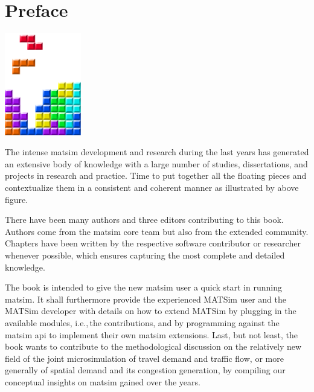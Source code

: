 \chapter*{Preface}

\begin{center} \includegraphics[width=0.25\textwidth, angle=0]{figures/MATSimBook.png} \end{center}

The intense \gls{matsim} development and research during the last years has generated an extensive body of knowledge with a large number of studies, dissertations, and projects in research and practice. Time to put together all the floating pieces and contextualize them in a consistent and coherent manner as illustrated by above figure. 

There have been many authors and three editors contributing to this book. Authors come from the \gls{matsim} core team but also from the extended community. Chapters have been written by the respective software contributor or researcher whenever possible, which ensures capturing the most complete and detailed knowledge.

The book is intended to give the new \gls{matsim} user a quick start in running \gls{matsim}. It shall furthermore provide the experienced MATSim user and the MATSim developer with details on how to extend MATSim by plugging in the available modules, i.e.,\,the \glspl{contribution}, and by programming against the \gls{matsim} \gls{api} to implement their own \gls{matsim} \glspl{extension}. Last, but not least, the book wants to contribute to the methodological discussion on the relatively new field of the joint \gls{microsimulation} of travel demand and traffic flow, or more generally of spatial demand and its congestion generation, by compiling our conceptual insights on \gls{matsim} gained over the years.

